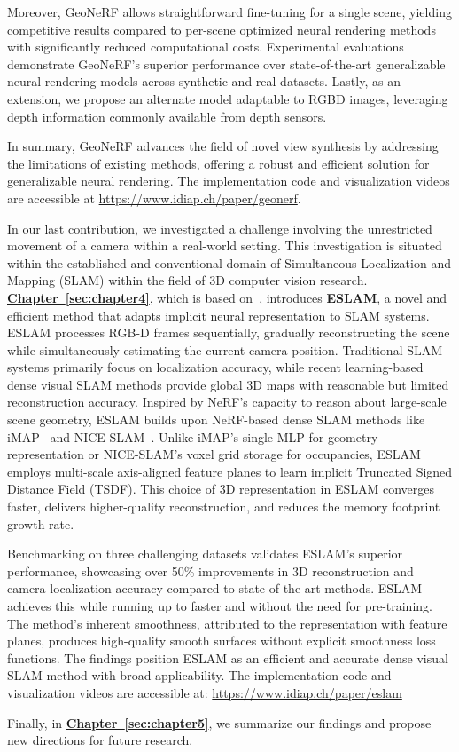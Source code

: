 Moreover, GeoNeRF allows straightforward fine-tuning for a single scene, yielding competitive results compared to per-scene optimized neural rendering methods with significantly reduced computational costs. Experimental evaluations demonstrate GeoNeRF's superior performance over state-of-the-art generalizable neural rendering models across synthetic and real datasets. Lastly, as an extension, we propose an alternate model adaptable to RGBD images, leveraging depth information commonly available from depth sensors.

In summary, GeoNeRF advances the field of novel view synthesis by addressing the limitations of existing methods, offering a robust and efficient solution for generalizable neural rendering. The implementation code and visualization videos are accessible at \href{https://www.idiap.ch/paper/geonerf}{https://www.idiap.ch/paper/geonerf}.

In our last contribution, we investigated a challenge involving the unrestricted movement of a camera within a real-world setting. This investigation is situated within the established and conventional domain of Simultaneous Localization and Mapping (SLAM) within the field of 3D computer vision research. \textbf{\hyperref[sec:chapter4]{Chapter~\ref{sec:chapter4}}}, which is based on~\cite{johari2023eslam}, introduces \textbf{ESLAM}, a novel and efficient method that adapts implicit neural representation to SLAM systems. ESLAM processes RGB-D frames sequentially, gradually reconstructing the scene while simultaneously estimating the current camera position. Traditional SLAM systems primarily focus on localization accuracy, while recent learning-based dense visual SLAM methods provide global 3D maps with reasonable but limited reconstruction accuracy. Inspired by NeRF's capacity to reason about large-scale scene geometry, ESLAM builds upon NeRF-based dense SLAM methods like iMAP~\citep{sucar2021imap} and NICE-SLAM~\citep{zhu2022nice}. Unlike iMAP's single MLP for geometry representation or NICE-SLAM's voxel grid storage for occupancies, ESLAM employs multi-scale axis-aligned feature planes to learn implicit Truncated Signed Distance Field (TSDF). This choice of 3D representation in ESLAM converges faster, delivers higher-quality reconstruction, and reduces the memory footprint growth rate.

Benchmarking on three challenging datasets validates ESLAM's superior performance, showcasing over 50\% improvements in 3D reconstruction and camera localization accuracy compared to state-of-the-art methods. ESLAM achieves this while running up to  faster and without the need for pre-training. The method's inherent smoothness, attributed to the representation with feature planes, produces high-quality smooth surfaces without explicit smoothness loss functions. The findings position ESLAM as an efficient and accurate dense visual SLAM method with broad applicability. The implementation code and visualization videos are accessible at: \href{https://www.idiap.ch/paper/eslam}{https://www.idiap.ch/paper/eslam}

Finally, in \textbf{\hyperref[sec:chapter5]{Chapter~\ref{sec:chapter5}}}, we summarize our findings and propose new directions for future research.